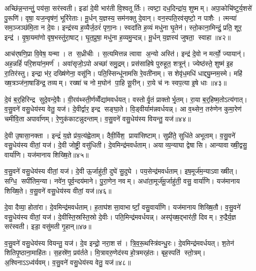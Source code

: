 अच्छि॑न्न॒न्तन्तुं॒ पय॑सा॒ सर॑स्वती। इडा॑ दे॒वी भार॑ती वि॒श्वतूर्तिः। त्वष्टा॒ दध॒दिन्द्रा॑य॒ शुष्मम्। अपा॒कोचि॑ष्टुर्य॒शसे॑ पु॒रूणि॑। वृषा॒ यज॒न्वृष॑णं॒ भूरि॑रेताः। मू॒र्धन् य॒ज्ञस्य॒ सम॑नक्तु दे॒वान्। वन॒स्पति॒रव॑सृष्टो॒ न पाशैः। त्मन्या॑ सम॒ञ्जञ्छ॑मि॒ता न दे॒वः। इन्द्र॑स्य ह॒व्यैर्ज॒ठरं॑ पृणा॒नः। स्वदा॑ति ह॒व्यं मधु॑ना घृ॒तेन॑। स्तो॒काना॒मिन्दुं॒ प्रति॒ शूर॒ इन्द्र॑। वृ॒षा॒यमा॑णो वृष॒भस्तु॑रा॒षाट्। घृ॒त॒प्रुषा॒ मधु॑ना ह॒व्यमु॒न्दन्न्। मू॒र्धन् य॒ज्ञस्य॑ जुषता॒ स्वाहा॥४२॥\anuvakamend[शर्ध॑मानो॒ महो॑भि॒ पत्नीर्घृ॒तेन॑ च॒त्वारि॑ च]

आच॑र्‌षणि॒प्रा वि॒वेष॒ यन्मा। त स॒ध्रीचीः। स॒त्यमित्तन्न त्वावा अ॒न्यो अस्ति॑। इन्द्र॑ दे॒वो न मर्त्यो॒ ज्यायान्॑। अह॒न्नहिं॑ परि॒शया॑न॒मर्ण॑। अवा॑सृजो॒ऽपो अच्छा॑ समु॒द्रम्। प्रस॑साहिषे पुरुहूत॒ शत्रून्॑। ज्येष्ठ॑स्ते॒ शुष्म॑ इ॒ह रा॒तिर॑स्तु। इन्द्रा भ॑र॒ दख्षि॑णेना॒ वसू॑नि। पति॒स्सिन्धू॑नामसि रे॒वती॑नाम्। स शेवृ॑ध॒मधि॑ धाद्द्यु॒म्नम॒स्मे। महि॑ ख्ष॒त्रञ्ज॑ना॒षाडि॑न्द्र॒ तव्यम्। रख्षा॑ च नो म॒घोन॑ पा॒हि सू॒रीन्। रा॒ये च॑ नः स्वप॒त्या इ॒षे धाः॥४३॥\anuvakamend[रे॒वती॑नाञ्च॒त्वारि॑ च]

दे॒वं ब॒र्॒हिरिन्द्र सुदे॒वन्दे॒वैः। वी॒रव॑थ्स्ती॒र्णव्वेँद्या॑मवर्धयत्। वस्तोर्वृ॒तं प्राक्तोर्भृ॒तम्। रा॒या ब॒र्॒हिष्म॒तोऽत्य॑गात्। व॒सु॒वने॑ वसु॒धेय॑स्य वेतु॒ यज॑। दे॒वीर्द्वार॒ इन्द्र सङ्घा॒ते। वि॒ड्वीर्याम॑न्नवर्धयन्न्। आ व॒थ्सेन॒ तरु॑णेन कुमा॒रेण॑ चमीवि॒ता अपार्वा॑णम्। रे॒णुक॑काटन्नुदन्ताम्। व॒सु॒वने॑ वसु॒धेय॑स्य वियन्तु॒ यज॑॥४४॥

दे॒वी उ॒षासा॒नक्ता। इन्द्रं॑ य॒ज्ञे प्र॑य॒त्य॑ह्वेताम्। दैवी॒र्विश॒ प्राया॑सिष्टाम्। सुप्री॑ते॒ सुधि॑ते अभूताम्। व॒सु॒वने॑ वसु॒धेय॑स्य वीतां॒ यज॑। दे॒वी जोष्ट्री॒ वसु॑धिती। दे॒वमिन्द्र॑मवर्धताम्। अयाव्य॒न्याघा द्वेषासि। आन्यावाख्षी॒द्वसु॒ वार्या॑णि। यज॑मानाय शिख्षि॒ते॥४५॥

व॒सु॒वने॑ वसु॒धेय॑स्य वीतां॒ यज॑। दे॒वी ऊ॒र्जाहु॑ती॒ दुघे॑ सु॒दुघे। पय॒सेन्द्र॑मवर्धताम्। इष॒मूर्ज॑म॒न्याऽवाख्षीत्। सग्धि॒ सपी॑तिम॒न्या। नवे॑न॒ पूर्व॒न्दय॑माने। पु॒रा॒णेन॒ नवम्। अधा॑ता॒मूर्ज॑मू॒र्जाहु॑ती॒ वसु॒ वार्या॑णि। यज॑मानाय शिख्षि॒ते। व॒सु॒वने॑ वसु॒धेय॑स्य वीतां॒ यज॑॥४६॥

दे॒वा दैव्या॒ होता॑रा। दे॒वमिन्द्र॑मवर्धताम्। ह॒ताघ॑शसा॒वाभार्ष्टां॒ वसु॒वार्या॑णि। यज॑मानाय शिख्षि॒तौ। व॒सु॒वने॑ वसु॒धेय॑स्य वीतां॒ यज॑। दे॒वीस्ति॒स्रस्ति॒स्रो दे॒वीः। पति॒मिन्द्र॑मवर्धयन्न्। अस्पृ॑ख्ष॒द्भार॑ती॒ दिवम्। रु॒द्रैर्य॒ज्ञ सर॑स्वती। इडा॒ वसु॑मती गृ॒हान्॥४७॥

व॒सु॒वने॑ वसु॒धेय॑स्य वियन्तु॒ यज॑। दे॒व इन्द्रो॒ नरा॒शस॑। त्रि॒व॒रू॒थस्त्रि॑वन्धु॒रः। दे॒वमिन्द्र॑मवर्धयत्। श॒तेन॑ शितिपृ॒ष्ठाना॒माहि॑तः। स॒हस्रे॑ण॒ प्रव॑र्तते। मि॒त्रावरु॒णेद॑स्य हो॒त्रमर्‌ह॑तः। बृह॒स्पति॑ स्तो॒त्रम्। अ॒श्विनाऽऽध्व॑र्यवम्। व॒सु॒वने॑ वसु॒धेय॑स्य वेतु॒ यज॑॥४८॥

